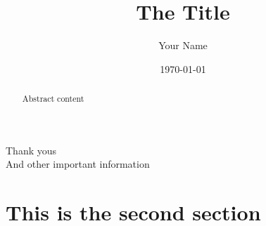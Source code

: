 \documentclass[12pt, a4paper, twoside]{article} %
\author{Your Name}
\title{The Title}
\date{\today}
\begin{document}
	\pagestyle{empty}
	\begin{titlepage}
		\maketitle
		\begin{abstract}
			Abstract content
		\end{abstract}
	{} %
	\end{titlepage}

	\cleardoublepage %

	{\centering Thank yous\\}
	\vfill
	And other important information

	\cleardoublepage

	
	\tableofcontents %
	\clearpage
	\listoffigures %
	\clearpage
	\listoftables %
	\clearpage
	\lstlistoflistings %
	\cleardoublepage
	
	\pagestyle{fancy}
	
	
	\section{This is the second section}
	\lipsum
\end{document}
